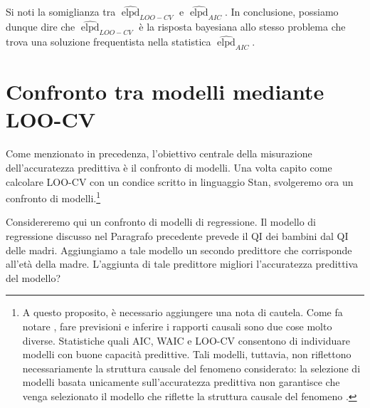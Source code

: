 \documentclass[
  11pt,
]{krantz}
\DeclareMathOperator{\elpd}{elpd} %
\theoremstyle{definition}
\theoremstyle{definition}
\theoremstyle{definition}
\theoremstyle{definition}
\theoremstyle{remark}
\begin{document}
Si noti la somiglianza tra \(\widehat{\elpd}_{LOO-CV}\) e \(\widehat{\elpd}_{AIC}\). In conclusione, possiamo dunque dire che \(\widehat{\elpd}_{LOO-CV}\) è la risposta bayesiana allo stesso problema che trova una soluzione frequentista nella statistica \(\widehat{\elpd}_{AIC}\).

\hypertarget{confronto-tra-modelli-mediante-loo-cv}{%
\section{Confronto tra modelli mediante LOO-CV}\label{confronto-tra-modelli-mediante-loo-cv}}

Come menzionato in precedenza, l'obiettivo centrale della misurazione dell'accuratezza predittiva è il confronto di modelli. Una volta capito come calcolare LOO-CV con un condice scritto in linguaggio Stan, svolgeremo ora un confronto di modelli.\footnote{A questo proposito, è necessario aggiungere una nota di cautela. Come fa notare \citet{McElreath_rethinking}, fare previsioni e inferire i rapporti causali sono due cose molto diverse. Statistiche quali AIC, WAIC e LOO-CV consentono di individuare modelli con buone capacità predittive. Tali modelli, tuttavia, non riflettono necessariamente la struttura causale del fenomeno considerato: la selezione di modelli basata unicamente sull'accuratezza predittiva non garantisce che venga selezionato il modello che riflette la struttura causale del fenomeno \citep[si veda anche][]{navarro2019between}.}

Considereremo qui un confronto di modelli di regressione. Il modello di regressione discusso nel Paragrafo precedente prevede il QI dei bambini dal QI delle madri. Aggiungiamo a tale modello un secondo predittore che corrisponde all'età della madre. L'aggiunta di tale predittore migliori l'accuratezza predittiva del modello?
\end{document}
